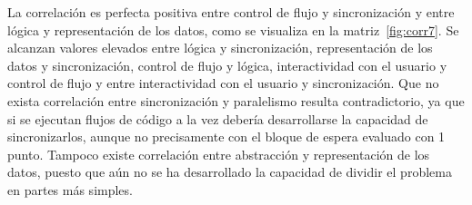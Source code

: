 \documentclass[a4paper, 12pt]{book}
\begin{document}
La correlación es perfecta positiva entre control de flujo y sincronización y entre lógica y representación de los datos, como se visualiza en la matriz~\ref{fig:corr7}. Se alcanzan valores elevados entre lógica y sincronización, representación de los datos y sincronización, control de flujo y lógica, interactividad con el usuario y control de flujo y entre interactividad con el usuario y sincronización. Que no exista correlación entre sincronización y paralelismo resulta contradictorio, ya que si se ejecutan flujos de código a la vez debería desarrollarse la capacidad de sincronizarlos, aunque no precisamente con el bloque de espera evaluado con 1 punto. Tampoco existe correlación entre abstracción y representación de los datos, puesto que aún no se ha desarrollado la capacidad de dividir el problema en partes más simples.
\end{document}
